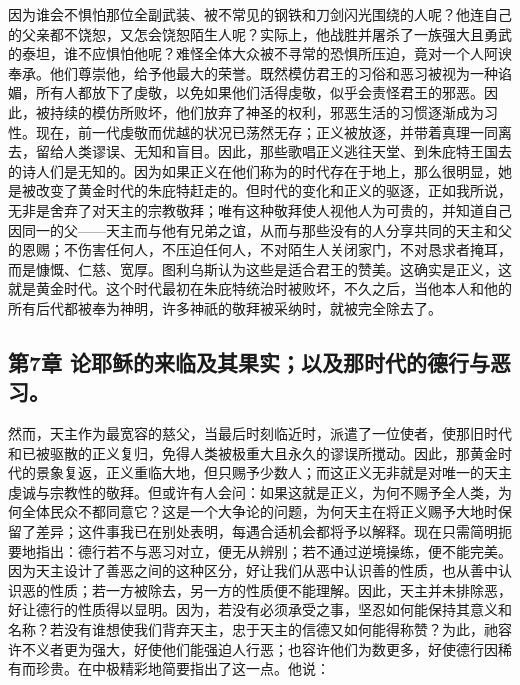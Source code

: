 因为谁会不惧怕那位全副武装、被不常见的钢铁和刀剑闪光围绕的人呢？他连自己的父亲都不饶恕，又怎会饶恕陌生人呢？实际上，他战胜并屠杀了一族强大且勇武的泰坦，谁不应惧怕他呢？难怪全体大众被不寻常的恐惧所压迫，竟对一个人阿谀奉承。他们尊崇他，给予他最大的荣誉。既然模仿君王的习俗和恶习被视为一种谄媚，所有人都放下了虔敬，以免如果他们活得虔敬，似乎会责怪君王的邪恶。因此，被持续的模仿所败坏，他们放弃了神圣的权利，邪恶生活的习惯逐渐成为习性。现在，前一代虔敬而优越的状况已荡然无存；正义被放逐，并带着真理一同离去，留给人类谬误、无知和盲目。因此，那些歌唱正义逃往天堂、到朱庇特王国去的诗人们是无知的。因为如果正义在他们称为的时代存在于地上，那么很明显，她是被改变了黄金时代的朱庇特赶走的。但时代的变化和正义的驱逐，正如我所说，无非是舍弃了对天主的宗教敬拜；唯有这种敬拜使人视他人为可贵的，并知道自己因同一的父——天主而与他有兄弟之谊，从而与那些没有的人分享共同的天主和父的恩赐；不伤害任何人，不压迫任何人，不对陌生人关闭家门，不对恳求者掩耳，而是慷慨、仁慈、宽厚。图利乌斯认为这些是适合君王的赞美。这确实是正义，这就是黄金时代。这个时代最初在朱庇特统治时被败坏，不久之后，当他本人和他的所有后代都被奉为神明，许多神祇的敬拜被采纳时，就被完全除去了。\par


\subsection{第7章 论耶稣的来临及其果实；以及那时代的德行与恶习。}

然而，天主作为最宽容的慈父，当最后时刻临近时，派遣了一位使者，使那旧时代和已被驱散的正义复归，免得人类被极重大且永久的谬误所搅动。因此，那黄金时代的景象复返，正义重临大地，但只赐予少数人；而这正义无非就是对唯一的天主虔诚与宗教性的敬拜。但或许有人会问：如果这就是正义，为何不赐予全人类，为何全体民众不都同意它？这是一个大争论的问题，为何天主在将正义赐予大地时保留了差异；这件事我已在别处表明，每遇合适机会都将予以解释。现在只需简明扼要地指出：德行若不与恶习对立，便无从辨别；若不通过逆境操练，便不能完美。因为天主设计了善恶之间的这种区分，好让我们从恶中认识善的性质，也从善中认识恶的性质；若一方被除去，另一方的性质便不能理解。因此，天主并未排除恶，好让德行的性质得以显明。因为，若没有必须承受之事，坚忍如何能保持其意义和名称？若没有谁想使我们背弃天主，忠于天主的信德又如何能得称赞？为此，祂容许不义者更为强大，好使他们能强迫人行恶；也容许他们为数更多，好使德行因稀有而珍贵。在中极精彩地简要指出了这一点。他说：\par

